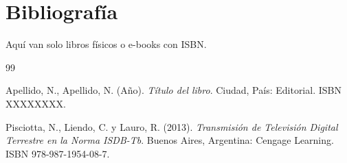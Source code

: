 \chapter*{Bibliografía}

Aquí van solo libros físicos o e-books con ISBN.

\begin{thebibliography}{99}

 Apellido, N., Apellido, N. (Año). \textit{Título del libro}. Ciudad, País: Editorial. ISBN XXXXXXXX.

 Pisciotta, N., Liendo, C. y Lauro, R. (2013). \textit{Transmisión de Televisión Digital Terrestre en la Norma ISDB-Tb}. Buenos Aires, Argentina: Cengage Learning. ISBN 978-987-1954-08-7.

\end{thebibliography}